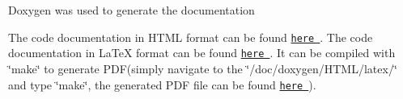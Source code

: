 Doxygen was used to generate the documentation

The code documentation in H\-T\-M\-L format can be found \href{./doxygen/HTML/html/index.html}{\tt here }.  The code documentation in La\-Te\-X format can be found \href{./doxygen/HTML/latex/refman.tex}{\tt here }. It can be compiled with \char`\"{}make\char`\"{} to generate P\-D\-F(simply navigate to the \char`\"{}/doc/doxygen/\-H\-T\-M\-L/latex/\char`\"{} and type \char`\"{}make\char`\"{}, the generated P\-D\-F file can be found \href{./doxygen/HTML/latex/refman.pdf}{\tt here }). 